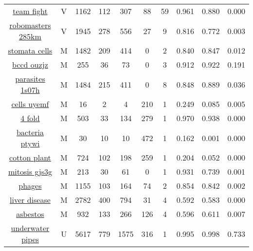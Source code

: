 \begin{longtable}{|| c | c | c c c | c c | c c c ||}
\cline{1-10}
\href{https://app.roboflow.com/roboflow-100/team-fight-tactics/1}{team fight} & V & 1162 & 112 & 307 & 88 & 59 & 0.961 & 0.880 & 0.000 \\
\cline{1-10}
\href{https://app.roboflow.com/roboflow-100/robomasters-285km/1}{robomasters 285km} & V & 1945 & 278 & 556 & 27 & 9 & 0.816 & 0.772 & 0.003 \\
\cline{1-10}
\href{https://app.roboflow.com/roboflow-100/stomata-cells/1}{stomata cells} & M & 1482 & 209 & 414 & 0 & 2 & 0.840 & 0.847 & 0.012 \\
\cline{1-10}
\href{https://app.roboflow.com/roboflow-100/bccd-ouzjz/1}{bccd ouzjz} & M & 255 & 36 & 73 & 0 & 3 & 0.912 & 0.922 & 0.191 \\
\cline{1-10}
\href{https://app.roboflow.com/roboflow-100/parasites-1s07h/1}{parasites 1s07h} & M & 1484 & 215 & 411 & 0 & 8 & 0.848 & 0.889 & 0.036 \\
\cline{1-10}
\href{https://app.roboflow.com/roboflow-100/cells-uyemf/1}{cells uyemf} & M & 16 & 2 & 4 & 210 & 1 & 0.249 & 0.085 & 0.005 \\
\cline{1-10}
\href{https://app.roboflow.com/roboflow-100/4-fold-defect/1}{4 fold} & M & 503 & 33 & 134 & 279 & 1 & 0.970 & 0.938 & 0.000 \\
\cline{1-10}
\href{https://app.roboflow.com/roboflow-100/bacteria-ptywi/1}{bacteria ptywi} & M & 30 & 10 & 10 & 472 & 1 & 0.162 & 0.001 & 0.000 \\
\cline{1-10}
\href{https://app.roboflow.com/roboflow-100/cotton-plant-disease/1}{cotton plant} & M & 724 & 102 & 198 & 259 & 1 & 0.204 & 0.052 & 0.000 \\
\cline{1-10}
\href{https://app.roboflow.com/roboflow-100/mitosis-gjs3g/1}{mitosis gjs3g} & M & 213 & 30 & 61 & 0 & 1 & 0.931 & 0.739 & 0.001 \\
\cline{1-10}
\href{https://app.roboflow.com/roboflow-100/phages/1}{phages} & M & 1155 & 103 & 164 & 74 & 2 & 0.854 & 0.842 & 0.002 \\
\cline{1-10}
\href{https://app.roboflow.com/roboflow-100/liver-disease/1}{liver disease} & M & 2782 & 400 & 794 & 31 & 4 & 0.592 & 0.583 & 0.000 \\
\cline{1-10}
\href{https://app.roboflow.com/roboflow-100/asbestos/1}{asbestos} & M & 932 & 133 & 266 & 126 & 4 & 0.596 & 0.611 & 0.007 \\
\cline{1-10}
\href{https://app.roboflow.com/roboflow-100/underwater-pipes-4ng4t/1}{underwater pipes} & U & 5617 & 779 & 1575 & 316 & 1 & 0.995 & 0.998 & 0.733 \\

\end{longtable}
